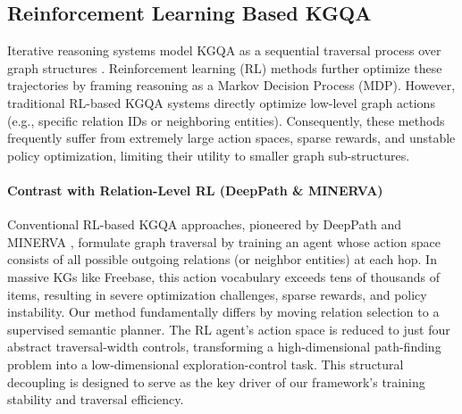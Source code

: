 \documentclass[10pt,conference]{IEEEtran}
\begin{document}
\subsection{Reinforcement Learning Based KGQA}
Iterative reasoning systems model KGQA as a sequential traversal process over graph structures \cite{xiong2017deeppath, das2017go, lin2018multi, sun2018open, xian2019reinforcement, sun2019pullnet, wang2020reasoning}. Reinforcement learning (RL) methods further optimize these trajectories by framing reasoning as a Markov Decision Process (MDP). However, traditional RL-based KGQA systems directly optimize low-level graph actions (e.g., specific relation IDs or neighboring entities). Consequently, these methods frequently suffer from extremely large action spaces, sparse rewards, and unstable policy optimization, limiting their utility to smaller graph sub-structures.

\paragraph*{Contrast with Relation-Level RL (DeepPath \& MINERVA)}
Conventional RL-based KGQA approaches, pioneered by DeepPath \cite{xiong2017deeppath} and MINERVA \cite{das2017go}, formulate graph traversal by training an agent whose action space consists of all possible outgoing relations (or neighbor entities) at each hop. In massive KGs like Freebase, this action vocabulary exceeds tens of thousands of items, resulting in severe optimization challenges, sparse rewards, and policy instability. Our method fundamentally differs by moving relation selection to a supervised semantic planner. The RL agent's action space is reduced to just four abstract traversal-width controls, transforming a high-dimensional path-finding problem into a low-dimensional exploration-control task. This structural decoupling is designed to serve as the key driver of our framework's training stability and traversal efficiency.
\end{document}
